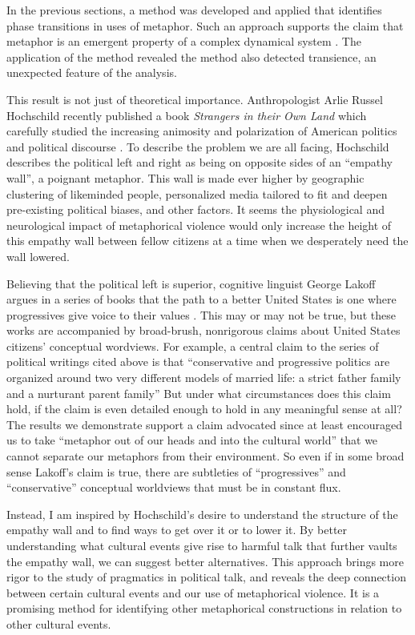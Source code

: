 In the previous sections, a method was developed and applied that identifies
phase transitions in uses of metaphor. Such an approach supports the 
claim that metaphor is an emergent property of a complex
dynamical system \cite{Cameron2006}. The application of the method revealed 
the method also detected transience, an unexpected feature of the analysis.

This result is not just of theoretical importance. Anthropologist
Arlie Russel Hochschild recently published a book \textit{Strangers in their
Own Land} which carefully studied the increasing animosity and 
polarization of American politics and political discourse \cite{Hochschild2016}.
To describe the problem we are all facing, Hochschild 
describes the political left and right as being on opposite sides of
an ``empathy wall'', a poignant metaphor. 
This wall is made ever higher by geographic clustering of likeminded people,
personalized media tailored to fit and deepen pre-existing political biases, and other 
factors. It seems the physiological and neurological impact of metaphorical
violence would only increase the height of this empathy wall between fellow citizens at a time
when we desperately need the wall lowered.

Believing that the political left is superior, cognitive linguist George Lakoff
argues in a series of books that the path to a better United States is 
one where progressives give voice to their values 
\cite{Lakoff1996, Lakoff2004, Lakoff2008, Lakoff2012}. 
This may or may not be true, 
but these works are accompanied by broad-brush, nonrigorous claims about United
States citizens' conceptual wordviews. For example, a central
claim to the series of political writings cited above 
is that ``conservative and progressive politics are organized around 
two very different models of married life: a strict father family and a 
nurturant parent family'' \cite[p.47]{Lakoff2004} But
under what circumstances does this claim hold, if the claim is even detailed
enough to hold in any meaningful sense at all? The results we demonstrate
support a claim advocated since at least  
encouraged us to take ``metaphor out of our heads and into the cultural
world'' that 
we cannot separate our metaphors from their environment. So even if in some
broad sense Lakoff's claim is true, there are subtleties of ``progressives''
and ``conservative'' conceptual worldviews that must be in constant flux.

Instead, I am inspired by Hochschild's desire to understand the structure
of the empathy wall and to find ways to get over it or to lower it. By better
understanding what cultural events give rise to harmful talk that further vaults
the empathy wall, we can suggest better alternatives. This approach brings
more rigor to the study of pragmatics in political talk, and reveals the
deep connection between certain cultural events and our use of metaphorical
violence. It is a promising method for identifying other metaphorical 
constructions in relation to other cultural events.

